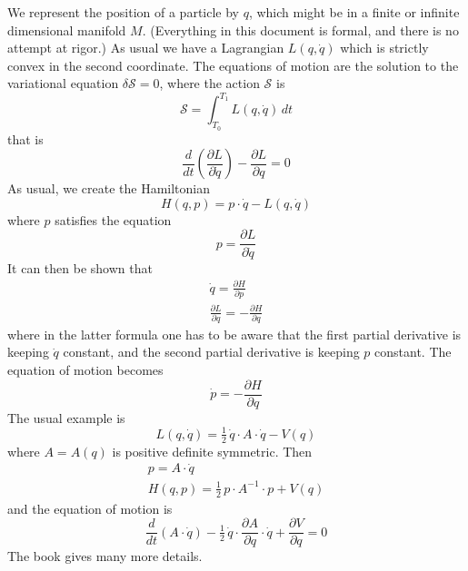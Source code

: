 \documentclass{amsart}
\begin{document}
We represent the position of a particle by $q$, which might be in a finite or infinite dimensional manifold $M$.  (Everything in this document is formal, and there is no attempt at rigor.)  As usual we have a Lagrangian $L(q,\dot q)$ which is strictly convex in the second coordinate.  The equations of motion are the solution to the variational equation $\delta \mathcal S = 0$, where the action $\mathcal S$ is
\begin{equation}
\mathcal S = \int_{T_0}^{T_1} L(q,\dot q) \, dt
\end{equation}
that is
\begin{equation}
\frac d{dt}\left(\frac{\partial L}{\partial \dot q}\right) - \frac{\partial L}{\partial q} = 0
\end{equation}
As usual, we create the Hamiltonian
\begin{equation}
\label{H from L}
H(q,p) = p \cdot \dot q - L(q,\dot q)
\end{equation}
where $p$ satisfies the equation
\begin{equation}
\label{p from dot q}
p = \frac{\partial L}{\partial \dot q}
\end{equation}
It can then be shown that
\begin{gather}
\label{dot q from p}
\dot q = \frac{\partial H}{\partial p} \\
\label{Lq = -Hq}
\frac{\partial L}{\partial q} = - \frac{\partial H}{\partial q}
\end{gather}
where in the latter formula one has to be aware that the first partial derivative is keeping $\dot q$ constant, and the second partial derivative is keeping $p$ constant.  The equation of motion becomes
\begin{equation}
\dot p = - \frac{\partial H}{\partial q}
\end{equation}
The usual example is
\begin{equation}
L(q,\dot q) = \tfrac12 \, \dot q \cdot A \cdot \dot q - V(q)
\end{equation}
where $A = A(q)$ is positive definite symmetric.  Then
\begin{gather}
p = A \cdot \dot q \\
H(q,p) = \tfrac12 \, p \cdot A^{-1} \cdot p + V(q)
\end{gather}
and the equation of motion is
\begin{equation}
\frac d{dt} ( A \cdot \dot q) - \tfrac12 \, \dot q \cdot \frac{\partial A}{\partial q} \cdot \dot q + \frac{\partial V}{\partial q} = 0
\end{equation}
The book \cite{arnold} gives many more details.
\end{document}
